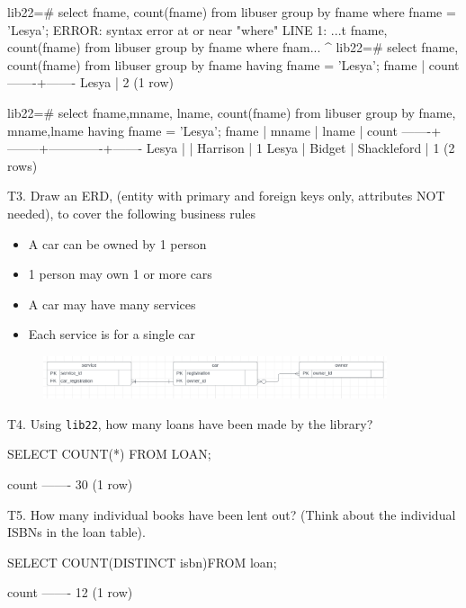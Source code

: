 \begin{pseudo}
lib22=# select fname, count(fname) from libuser group by fname where fname = 'Lesya';
ERROR:  syntax error at or near "where"
LINE 1: ...t fname, count(fname) from libuser group by fname where fnam...
                                                             ^
lib22=# select fname, count(fname) from libuser group by fname having fname = 'Lesya';
 fname | count
-------+-------
 Lesya |     2
(1 row)

lib22=# select fname,mname, lname, count(fname) from libuser group by fname, mname,lname having fname = 'Lesya';
 fname | mname  |    lname    | count
-------+--------+-------------+-------
 Lesya |        | Harrison    |     1
 Lesya | Bidget | Shackleford |     1
(2 rows)
\end{pseudo}

T3. Draw an ERD, (entity with primary and foreign keys only, attributes NOT needed), to cover the following business rules
\begin{itemize}
    \item A car can be owned by 1 person
    \item 1 person may own 1 or more cars
    \item A car may have many services
    \item Each service is for a single car
\end{itemize}

\begin{figure}[H]
    \centering
    \includegraphics[width=0.9\textwidth]{assets/misc-erd.png}
\end{figure}

T4. Using \verb|lib22|, how many loans have been made by the library?
\begin{sql}
SELECT COUNT(*) FROM LOAN;
\end{sql}
\begin{pseudo}
 count
-------
    30
(1 row)
\end{pseudo}

T5. How many individual books have been lent out? (Think about the individual ISBNs in the loan table).
\begin{sql}
SELECT COUNT(DISTINCT isbn)FROM loan;
\end{sql}
\begin{pseudo}
 count
-------
    12
(1 row)
\end{pseudo}

